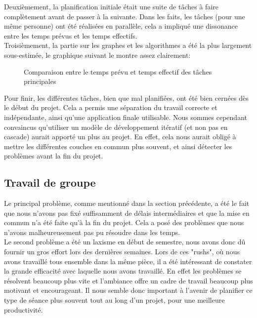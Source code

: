 \documentclass[french]{article}
\begin{document}
		Deuxièmement, la planification initiale était une suite de tâches à faire complètement avant de passer à la suivante. Dans les faits, les tâches (pour une même personne) ont été réalisées en parallèle, cela a impliqué une dissonance entre les temps prévus et les temps effectifs.\\
		
		Troisièmement, la partie sur les graphes et les algorithmes a été la plus largement sous-estimée, le graphique suivant le montre assez clairement:
		\begin{figure}[H]
			
			\caption{Comparaison entre le temps prévu et temps effectif des tâches
				principales}
			\label{fig:comparaisonheures}
		\end{figure}
		
		Pour finir, les différentes tâches, bien que mal planifiées, ont été bien cernées dès le début du projet. Cela a permis une séparation du travail correcte et indépendante, ainsi qu'une application finale utilisable. Nous sommes cependant convaincus qu'utiliser un modèle de développement itératif (et non pas en cascade) aurait apporté un plus au projet. En effet, cela nous aurait obligé à mettre les différentes couches en commun plus souvent, et ainsi détecter les problèmes avant la fin du projet. 
		
		\subsection{Travail de groupe}
		Le principal problème, comme mentionné dans la section précédente, a été le fait que nous n'avons pas fixé suffisamment de délais intermédiaires et que la mise en commun n'a été faite qu'à la fin du projet. Cela a posé des problèmes que nous n'avons malheureusement pas pu résoudre dans les temps.\\
		
		Le second problème a été un laxisme en début de semestre, nous avons donc dû fournir un gros effort lors des dernières semaines. Lors de ces "rushs", où nous avons travaillé tous ensemble dans la même pièce, il a été intéressant de constater la grande efficacité avec laquelle nous avons travaillé. En effet les problèmes se résolvent beaucoup plus vite et l'ambiance offre un cadre de travail beaucoup plus motivant et encourageant. Il nous semble donc important à l'avenir de planifier ce type de séance plus souvent tout au long d'un projet, pour une meilleure productivité.\\
		
\end{document}
